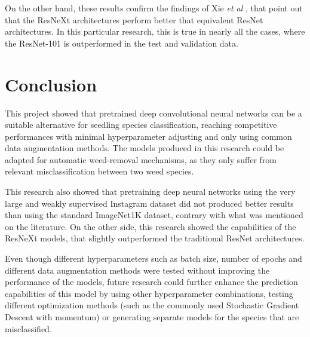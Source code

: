 \documentclass[11pt,onecolumn,titlepage,letterpaper]{article}
\begin{document}
On the other hand, these results confirm the findings of Xie \textit{et al} \cite{Xie2017}, that point out that the ResNeXt architectures perform better that equivalent ResNet architectures. In this particular research, this is true in nearly all the cases, where the ResNet-101 is outperformed in the test and validation data.

\section{Conclusion}

This project showed that pretrained deep convolutional neural networks can be a suitable alternative for seedling species classification, reaching competitive performances with minimal hyperparameter adjusting and only using common data augmentation methods. The models produced in this research could be adapted for automatic weed-removal mechanisms, as they only suffer from relevant misclassification between two weed species.

This research also showed that pretraining deep neural networks using the very large and weakly supervised Instagram dataset did not produced better results than using the standard ImageNet1K dataset, contrary with what was mentioned on the literature. On the other side, this research showed the capabilities of the ResNeXt models, that slightly outperformed the traditional ResNet architectures.

Even though different hyperparameters such as batch size, number of epochs and different data augmentation methods were tested without improving the performance of the models, future research could further enhance the prediction capabilities of this model by using other hyperparameter combinations, testing different optimization methods (such as the commonly used Stochastic Gradient Descent with momentum) or generating separate models for the species that are misclassified.


{\small


}
\end{document}
